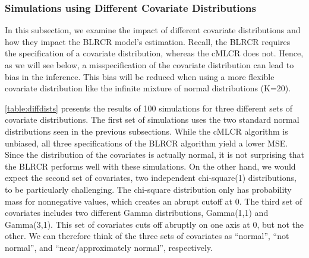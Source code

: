 \documentclass[
  12pt,
]{article}
\begin{document}
\subsubsection{Simulations using Different Covariate Distributions}
\label{Sec:simscovdists}

In this subsection, we examine the impact of different covariate
distributions and how they impact the BLRCR model's estimation. Recall,
the BLRCR requires the specification of a covariate distribution,
whereas the cMLCR does not. Hence, as we will see below, a
misspecification of the covariate distribution can lead to bias in the
inference. This bias will be reduced when using a more flexible
covariate distribution like the infinite mixture of normal distributions
(K=20).

\autoref{table:diffdists} presents the results of 100 simulations for
three different sets of covariate distributions. The first set of
simulations uses the two standard normal distributions seen in the
previous subsections. While the cMLCR algorithm is unbiased, all three
specifications of the BLRCR algorithm yield a lower MSE. Since the
distribution of the covariates is actually normal, it is not surprising
that the BLRCR performs well with these simulations. On the other hand,
we would expect the second set of covariates, two independent
chi-square(1) distributions, to be particularly challenging. The
chi-square distribution only has probability mass for nonnegative
values, which creates an abrupt cutoff at 0. The third set of covariates
includes two different Gamma distributions, Gamma(1,1) and Gamma(3,1).
This set of covariates cuts off abruptly on one axis at 0, but not the
other. We can therefore think of the three sets of covariates as
``normal'', ``not normal'', and ``near/approximately normal'',
respectively.
\end{document}
